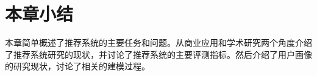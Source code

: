 		\begin{figure}
	    \centering
	      \label{pic:user_profile}
	    \end{figure}

	\section{本章小结}
	本章简单概述了推荐系统的主要任务和问题。从商业应用和学术研究两个角度介绍了推荐系统研究的现状，并讨论了推荐系统的主要评测指标。然后介绍了用户画像的研究现状，讨论了相关的建模过程。